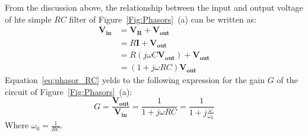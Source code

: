 From the discussion above, the relationship between the input and output voltage of hte simple $RC$ filter of Figure~\ref{Fig:Phasors}~(a) can be written as:
\begin{equation}
\label{eq:phasor_RC}
\begin{split}
\bm{V_{in}} &= \bm{V_R} + \bm{V_{out}}\\
            &= R\bm{I} + \bm{V_{out}}\\
            &= R\left(j\omega C\bm{V_{out}}\right) + \bm{V_{out}}\\
            &=\left(1 + j\omega RC \right)\bm{V_{out}} 
\end{split} 
\end{equation} 
Equation~\ref{eq:phasor_RC} yelds to the following expression for the gain $G$ of the circuit of Figure~\ref{Fig:Phasors}~(a):
\begin{equation}
G = \frac{\bm{V_{out}}}{\bm{V_{in}}} = \frac{1}{1 + j\omega RC} = \frac{1}{1 + j\frac{\omega}{\omega_0}}
\end{equation}
Where $\omega_0 = \frac{1}{RC}$.


